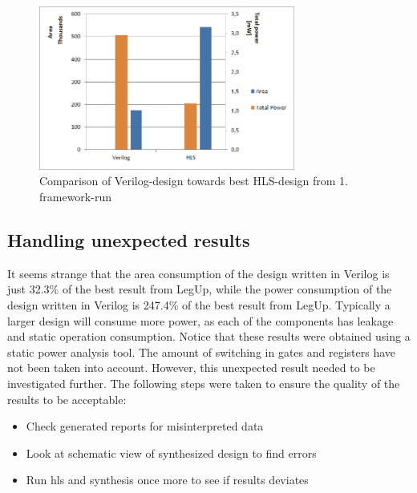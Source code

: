 \begin{figure}[hbpt]
\centering
\includegraphics[width=0.75\textwidth]{../figs/resultComparison1.png}
\caption{\label{fig:resultcomparisonhlsrun1}Comparison of Verilog-design towards best HLS-design from 1. framework-run}
\end{figure}

\subsection{Handling unexpected results}
It seems strange that the area consumption of the design written in Verilog is just 32.3\% of the best result from LegUp, while the power consumption of the design written in Verilog is 247.4\% of the best result from LegUp. Typically a larger design will consume more power, as each of the components has leakage and static operation consumption. Notice that these results were obtained using a static power analysis tool. The amount of switching in gates and registers have not been taken into account. However, this unexpected result needed to be investigated further. The following steps were taken to ensure the quality of the results to be acceptable:

\begin{itemize}
    \item Check generated reports for misinterpreted data
    \item Look at schematic view of synthesized design to find errors
    \item Run \gls{hls} and synthesis once more to see if results deviates
\end{itemize}

